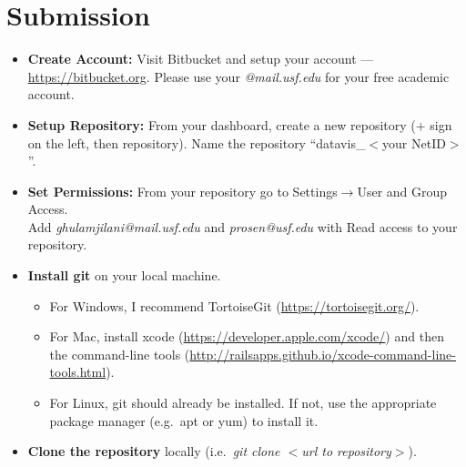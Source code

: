 \documentclass[a4paper,12pt]{article}
\begin{document}
\section{Submission}




\begin{itemize}
\item \textbf{Create Account:} Visit Bitbucket and setup your account  --- \url{https://bitbucket.org}. Please use your \textit{@mail.usf.edu} for your free academic account.

\item \textbf{Setup Repository:} From your dashboard, create a new repository ($+$ sign on the left, then repository).
 Name the repository ``datavis\_$<$your NetID$>$''.

\item \textbf{Set Permissions:}  From your repository go to Settings$\rightarrow$User and Group Access. \\
Add \textit{ghulamjilani@mail.usf.edu} and \textit{prosen@usf.edu} with Read access to your repository.

\item \textbf{Install git} on your local machine. 
\begin{itemize}
\item For Windows, I recommend TortoiseGit (\url{https://tortoisegit.org/}). 
\item For Mac, install xcode (\url{https://developer.apple.com/xcode/}) and then the command-line tools (\url{http://railsapps.github.io/xcode-command-line-tools.html}). 
\item For Linux, git should already be installed. If not, use the appropriate package manager (e.g.\ apt or yum) to install it.
\end{itemize}

\item \textbf{Clone the repository} locally (i.e.\ \textit{git clone $<$url to repository$>$}).


\end{itemize}
\end{document}
